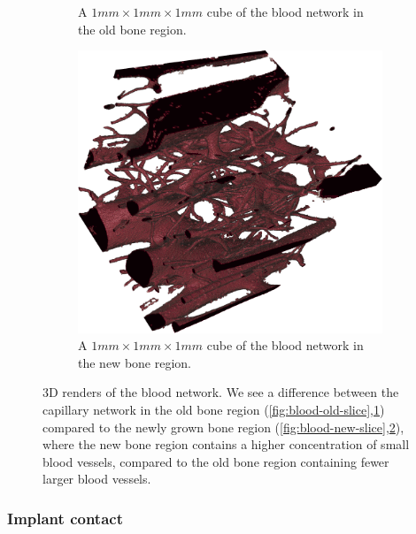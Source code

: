 \begin{figure}
\begin{subfigure}[b]{.48\linewidth}
        \caption{A $1mm \times 1 mm \times 1 mm$ cube of the blood network in the old bone region.}
        \label{fig:blood-old-cube}
    \end{subfigure}
    \hfill
    \begin{subfigure}[b]{.48\linewidth}
    \centering
        \includegraphics[width=.9\linewidth,height=\linewidth]{generated/figure10_new_cube.png}
        \caption{A $1mm \times 1 mm \times 1 mm$ cube of the blood network in the new bone region.}
        \label{fig:blood-new-cube}
    \end{subfigure}
    \caption{
        3D renders of the blood network. We see a difference between the
        capillary network in the old bone region
        (\ref{fig:blood-old-slice},\ref{fig:blood-old-cube}) compared to the
        newly grown bone region
        (\ref{fig:blood-new-slice},\ref{fig:blood-new-cube}), where the new
        bone region contains a higher concentration of small blood vessels,
        compared to the old bone region containing fewer larger blood vessels.
    }
    \label{fig:blood-network}
\end{figure}

\subsubsection{Implant contact}
\label{sec:contact}

